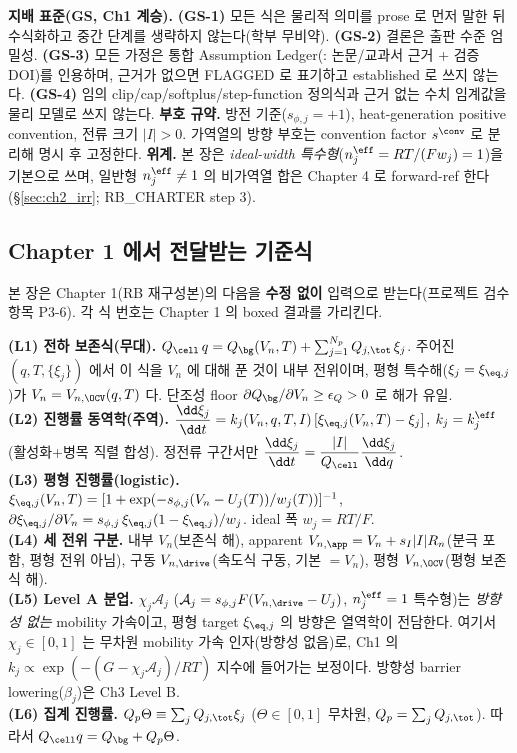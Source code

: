 \begin{groundingbox}
\textbf{지배 표준(GS, Ch1 계승).} \textbf{(GS-1)} 모든 식은 물리적 의미를 prose 로 먼저 말한 뒤 수식화하고
중간 단계를 생략하지 않는다(학부 무비약). \textbf{(GS-2)} 결론은 출판 수준 엄밀성. \textbf{(GS-3)} 모든 가정은
통합 Assumption Ledger(\AL{\#}: 논문/교과서 근거 + 검증 DOI)를 인용하며, 근거가 없으면 FLAGGED 로 표기하고
established 로 쓰지 않는다. \textbf{(GS-4)} 임의 clip/cap/softplus/step-function 정의식과 근거 없는 수치
임계값을 물리 모델로 쓰지 않는다. \textbf{부호 규약.} 방전 기준($s_{\phi,j}=+1$), heat-generation positive
convention, 전류 크기 $|I|>0$. 가역열의 방향 부호는 convention factor $s^{\conv}$ 로 분리해 명시 후 고정한다.
\textbf{위계.} 본 장은 \emph{ideal-width 특수형}($n_j^{\eff}=RT/(Fw_j)=1$)을 기본으로 쓰며, 일반형
$n_j^{\eff}\ne1$ 의 비가역열 합은 Chapter 4 로 forward-ref 한다(\S\ref{sec:ch2_irr}; RB\_CHARTER step 3).
\end{groundingbox}

\subsection{Chapter 1 에서 전달받는 기준식}\label{sec:ch2_inherit}
본 장은 Chapter 1(RB 재구성본)의 다음을 \textbf{수정 없이} 입력으로 받는다(프로젝트 검수 항목 P3-6). 각 식 번호는
Chapter 1 의 boxed 결과를 가리킨다.
\begin{linkbox}
\textbf{(L1) 전하 보존식(무대).} $Q_\cell\,q=Q_\bg(V_n,T)+\sum_{j=1}^{N_p}Q_{j,\tot}\,\xi_j$. 주어진
$(q,T,\{\xi_j\})$ 에서 이 식을 $V_n$ 에 대해 푼 것이 내부 전위이며, 평형 특수해($\xi_j=\xi_{\eq,j}$)가
$V_n=V_{n,\OCV}(q,T)$ 다. 단조성 floor $\partial Q_\bg/\partial V_n\ge\epsilon_Q>0$ 로 해가 유일.\\
\textbf{(L2) 진행률 동역학(주역).} $\dfrac{\dd\xi_j}{\dd t}=k_j(V_n,q,T,I)\,[\xi_{\eq,j}(V_n,T)-\xi_j]$,
$k_j=k_j^{\eff}$(활성화+병목 직렬 합성). 정전류 구간서만 $\dfrac{\dd\xi_j}{\dd t}=\dfrac{|I|}{Q_\cell}\dfrac{\dd\xi_j}{\dd q}$.\\
\textbf{(L3) 평형 진행률(logistic).} $\xi_{\eq,j}(V_n,T)=[1+\exp(-s_{\phi,j}(V_n-U_j(T))/w_j(T))]^{-1}$,
$\partial\xi_{\eq,j}/\partial V_n=s_{\phi,j}\,\xi_{\eq,j}(1-\xi_{\eq,j})/w_j$. ideal 폭 $w_j=RT/F$.\\
\textbf{(L4) 세 전위 구분.} 내부 $V_n$(보존식 해), apparent $V_{n,\app}=V_n+s_I|I|R_n$(분극 포함, 평형
전위 아님), 구동 $V_{n,\drive}$(속도식 구동, 기본 $=V_n$), 평형 $V_{n,\OCV}$(평형 보존식 해).\\
\textbf{(L5) Level A 분업.} $\chi_j\mathcal A_j$ ($\mathcal A_j=s_{\phi,j}F(V_{n,\drive}-U_j)$, $n_j^{\eff}=1$
특수형)는 \emph{방향성 없는} mobility 가속이고, 평형 target $\xi_{\eq,j}$ 의 방향은 열역학이 전담한다.
여기서 $\chi_j\in[0,1]$ 는 무차원 mobility 가속 인자(방향성 없음)로, Ch1 의 $k_j\propto\exp(-(G-\chi_j\mathcal A_j)/RT)$
지수에 들어가는 보정이다. 방향성 barrier lowering($\beta_j$)은 Ch3 Level B.\\
\textbf{(L6) 집계 진행률.} $Q_p\Theta\equiv\sum_jQ_{j,\tot}\xi_j$ ($\Theta\in[0,1]$ 무차원,
$Q_p=\sum_jQ_{j,\tot}$). 따라서 $Q_\cell q=Q_\bg+Q_p\Theta$.
\end{linkbox}

